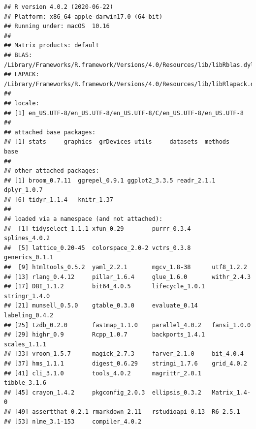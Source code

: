 \documentclass[]{article}
\begin{document}
\begin{verbatim}
## R version 4.0.2 (2020-06-22)
## Platform: x86_64-apple-darwin17.0 (64-bit)
## Running under: macOS  10.16
## 
## Matrix products: default
## BLAS:   /Library/Frameworks/R.framework/Versions/4.0/Resources/lib/libRblas.dylib
## LAPACK: /Library/Frameworks/R.framework/Versions/4.0/Resources/lib/libRlapack.dylib
## 
## locale:
## [1] en_US.UTF-8/en_US.UTF-8/en_US.UTF-8/C/en_US.UTF-8/en_US.UTF-8
## 
## attached base packages:
## [1] stats     graphics  grDevices utils     datasets  methods   base     
## 
## other attached packages:
## [1] broom_0.7.11  ggrepel_0.9.1 ggplot2_3.3.5 readr_2.1.1   dplyr_1.0.7  
## [6] tidyr_1.1.4   knitr_1.37   
## 
## loaded via a namespace (and not attached):
##  [1] tidyselect_1.1.1 xfun_0.29        purrr_0.3.4      splines_4.0.2   
##  [5] lattice_0.20-45  colorspace_2.0-2 vctrs_0.3.8      generics_0.1.1  
##  [9] htmltools_0.5.2  yaml_2.2.1       mgcv_1.8-38      utf8_1.2.2      
## [13] rlang_0.4.12     pillar_1.6.4     glue_1.6.0       withr_2.4.3     
## [17] DBI_1.1.2        bit64_4.0.5      lifecycle_1.0.1  stringr_1.4.0   
## [21] munsell_0.5.0    gtable_0.3.0     evaluate_0.14    labeling_0.4.2  
## [25] tzdb_0.2.0       fastmap_1.1.0    parallel_4.0.2   fansi_1.0.0     
## [29] highr_0.9        Rcpp_1.0.7       backports_1.4.1  scales_1.1.1    
## [33] vroom_1.5.7      magick_2.7.3     farver_2.1.0     bit_4.0.4       
## [37] hms_1.1.1        digest_0.6.29    stringi_1.7.6    grid_4.0.2      
## [41] cli_3.1.0        tools_4.0.2      magrittr_2.0.1   tibble_3.1.6    
## [45] crayon_1.4.2     pkgconfig_2.0.3  ellipsis_0.3.2   Matrix_1.4-0    
## [49] assertthat_0.2.1 rmarkdown_2.11   rstudioapi_0.13  R6_2.5.1        
## [53] nlme_3.1-153     compiler_4.0.2
\end{verbatim}
\end{document}
